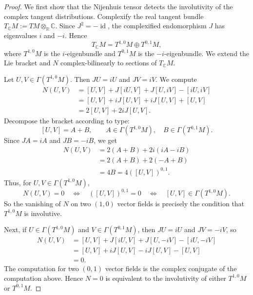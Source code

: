 \documentclass[12pt]{article}
\begin{document}
\begin{proof}
    We first show that the Nijenhuis tensor detects the involutivity of the complex tangent distributions. Complexify the real tangent bundle $T_{\mathbb C}M := TM\otimes_{\mathbb R}\mathbb C$.
    Since $J^2=-\operatorname{id}$, the complexified endomorphism $J$ has eigenvalues $i$ and $-i$. Hence
    \[
        T_{\mathbb C}M = T^{1,0}M \oplus T^{0,1}M,
    \]
    where $T^{1,0}M$ is the $i$-eigenbundle and $T^{0,1}M$ is the $-i$-eigenbundle. We extend the Lie bracket and $N$ complex-bilinearly to sections of $T_{\mathbb C}M$.

    Let $U,V\in \Gamma(T^{1,0}M)$. Then $JU=iU$ and $JV=iV$. We compute
    \begin{align*}
        N(U,V)
         & = [U,V] + J[iU,V] + J[U,iV] - [iU,iV] \\
         & = [U,V] + iJ[U,V] + iJ[U,V] + [U,V]   \\
         & = 2[U,V] + 2iJ[U,V].
    \end{align*}
    Decompose the bracket according to type:
    \[
        [U,V] = A+B,
        \qquad
        A\in \Gamma(T^{1,0}M),
        \quad
        B\in \Gamma(T^{0,1}M).
    \]
    Since $JA=iA$ and $JB=-iB$, we get
    \begin{align*}
        N(U,V)
         & = 2(A+B)+2i(iA-iB)    \\
         & = 2(A+B)+2(-A+B)      \\
         & = 4B =4([U,V])^{0,1}.
    \end{align*}
    Thus, for $U,V\in \Gamma(T^{1,0}M)$,
    \[
        N(U,V)=0
        \quad\Longleftrightarrow\quad
        ([U,V])^{0,1}=0
        \quad\Longleftrightarrow\quad
        [U,V]\in \Gamma(T^{1,0}M).
    \]
    So the vanishing of $N$ on two $(1,0)$ vector fields is precisely the condition that $T^{1,0}M$ is involutive.

    Next, if $U\in \Gamma(T^{1,0}M)$ and $V\in \Gamma(T^{0,1}M)$, then $JU=iU$ and $JV=-iV$, so
    \begin{align*}
        N(U,V)
         & = [U,V] + J[iU,V] + J[U,-iV] - [iU,-iV] \\
         & = [U,V] + iJ[U,V] - iJ[U,V] - [U,V]     \\
         & =0.
    \end{align*}
    The computation for two $(0,1)$ vector fields is the complex conjugate of the computation above. Hence $N=0$ is equivalent to the involutivity of either $T^{1,0}M$ or $T^{0,1}M$.


\end{proof}
\end{document}
